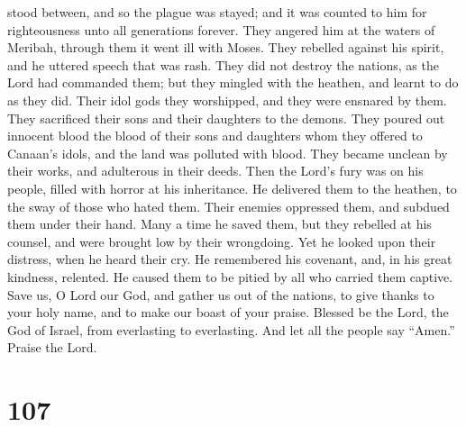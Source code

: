 stood between, and so the plague was stayed;  and it was
counted to him for righteousness unto all generations forever.
 They angered him at the waters of Meribah, through them it
went ill with Moses.  They rebelled against his spirit, and
he uttered speech that was rash.  They did not destroy the
nations, as the Lord had commanded them;  but they mingled
with the heathen, and learnt to do as they did.  Their idol
gods they worshipped, and they were ensnared by them.  They
sacrificed their sons and their daughters to the demons. 
They poured out innocent blood the blood of their sons and daughters
whom they offered to Canaan's idols, and the land was polluted with
blood.  They became unclean by their works, and adulterous
in their deeds.  Then the Lord's fury was on his people,
filled with horror at his inheritance.  He delivered them
to the heathen, to the sway of those who hated them.  Their
enemies oppressed them, and subdued them under their hand. 
Many a time he saved them, but they rebelled at his counsel, and were
brought low by their wrongdoing.  Yet he looked upon their
distress, when he heard their cry.  He remembered his
covenant, and, in his great kindness, relented.  He caused
them to be pitied by all who carried them captive.  Save
us, O Lord our God, and gather us out of the nations, to give thanks to
your holy name, and to make our boast of your praise. 
Blessed be the Lord, the God of Israel, from everlasting to everlasting.
And let all the people say ``Amen.'' Praise the Lord.

\hypertarget{section-106}{%
\section{107}\label{section-106}}


